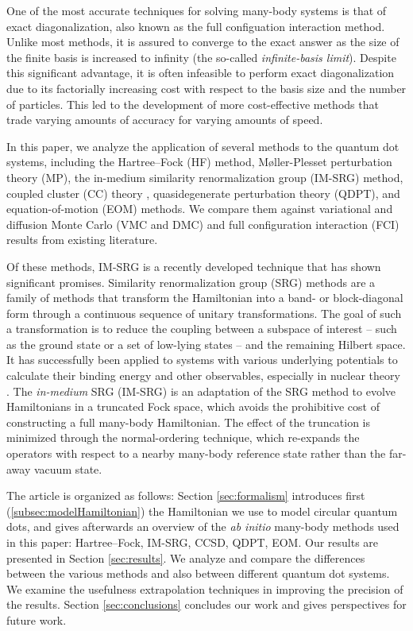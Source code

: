 One of the most accurate techniques for solving many-body systems is that of exact diagonalization, also known as the full configuation interaction method.  Unlike most methods, it is assured to converge to the exact answer as the size of the finite basis is increased to infinity (the so-called \textit{infinite-basis limit}).  Despite this significant advantage, it is often infeasible to perform exact diagonalization due to its factorially increasing cost with respect to the basis size and the number of particles.  This led to the development of more cost-effective methods that trade varying amounts of accuracy for varying amounts of speed.

In this paper, we analyze the application of several methods to the quantum dot systems, including the Hartree--Fock (HF) method, M\o ller-Plesset perturbation theory (MP), the in-medium similarity renormalization group (IM-SRG) method, coupled cluster (CC) theory \cite{PhysRevB.67.045320,heidari:114708,PhysRevB.84.115302}, quasidegenerate perturbation theory (QDPT), and equation-of-motion (EOM) methods.  We compare them against variational and diffusion Monte Carlo (VMC and DMC) \cite{PhysRevB.68.035304,PhysRevB.62.8120,PhysRevB.84.115302,PhysRevB.54.4780} and full configuration interaction (FCI) \cite{olsen2013thesis,JJAP.36.3924,PhysRevB.56.6428,2008arXiv0810.2644K,rontani:124102} results from existing literature.

Of these methods, IM-SRG is a recently developed technique that has shown significant promises.  Similarity renormalization group (SRG) methods are a family of methods that transform the Hamiltonian into a band- or block-diagonal form through a continuous sequence of unitary transformations.  The goal of such a transformation is to reduce the coupling between a subspace of interest -- such as the ground state or a set of low-lying states -- and the remaining Hilbert space.  It has successfully been applied to systems with various underlying potentials to calculate their binding energy and other observables, especially in nuclear theory \cite{ScottSRG,PhysRevC.75.061001,SRGThreeDim}.  The \emph{in-medium} SRG (IM-SRG) is an adaptation of the SRG method to evolve Hamiltonians in a truncated Fock space, which avoids the prohibitive cost of constructing a full many-body Hamiltonian.  The effect of the truncation is minimized through the normal-ordering technique, which re-expands the operators with respect to a nearby many-body reference state rather than the far-away vacuum state.

The article is organized as follows: Section \ref{sec:formalism} introduces first (\ref{subsec:modelHamiltonian}) the Hamiltonian we use to model circular quantum dots, and gives afterwards an overview of the \textit{ab initio} many-body methods used in this paper: Hartree--Fock, IM-SRG, CCSD, QDPT, EOM.  Our results are presented in Section \ref{sec:results}.  We analyze and compare the differences between the various methods and also between different quantum dot systems.  We examine the usefulness extrapolation techniques in improving the precision of the results.  Section \ref{sec:conclusions} concludes our work and gives perspectives for future work.


